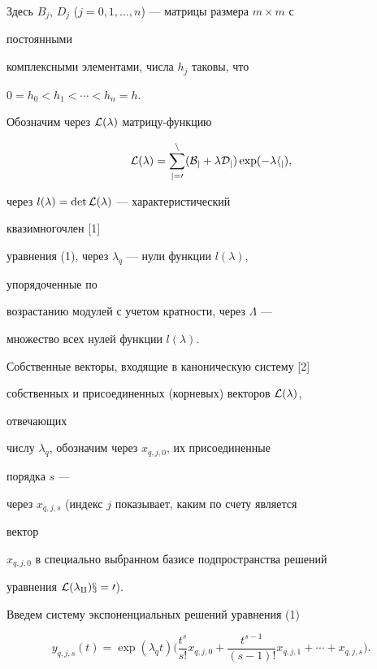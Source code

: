 Здесь $B_j$, $D_j$ ($j=0,1,\dotsc,n$) --- матрицы размера $m\times m$ с 


постоянными 


комплексными элементами, числа $h_j$ таковы, что 


$0=h_0<h_1<\dotsb<h_n=h$. 


 


Обозначим через $\cal L(\lambda)$ матрицу-функцию 


$$ 


\cal L(\lambda)=\sum^n_{j=0}(B_j+\lambda D_j)\exp(-\lambda h_j), 


$$ 


через $l(\lambda)=\det\cal L(\lambda)$ --- характеристический 


квазимногочлен [1] 


уравнения (1), через $\lambda_q$ --- нули функции $l(\lambda)$, 


упорядоченные по


возрастанию модулей с учетом кратности, через $\Lambda$ --- 


множество всех нулей функции $l(\lambda)$. 


 


Собственные векторы, входящие в каноническую систему [2] 


собственных и присоединенных (корневых) векторов $\cal L(\lambda)$, 


отвечающих 


числу $\lambda_q$, обозначим через $x_{q,j,0}$, их присоединенные 


порядка $s$ --- 


через $x_{q,j,s}$ (индекс $j$ показывает, каким по счету является 


вектор 


$x_{q,j,0}$ в специально выбранном базисе подпространства решений 


уравнения $\cal L(\lambda_q)x=0$). 


 


Введем систему экспоненциальных решений уравнения (1) 


\begin{equation} 


y_{q,j,s}(t)=\exp(\lambda_q t)\bigg(\frac{t^s}{s!}x_{q,j,0}+ 


\frac{t^{s-1}}{(s-1)!}x_{q,j,1}+\dotsb+x_{q,j,s}\bigg). 


\end{equation} 


